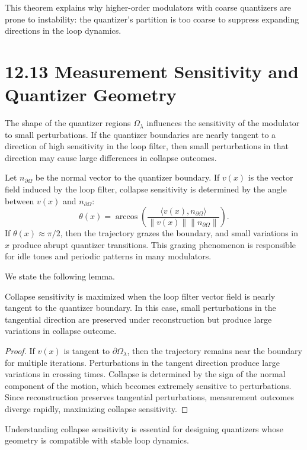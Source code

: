 This theorem explains why higher-order modulators with coarse quantizers are prone to instability: the quantizer’s partition is too coarse to suppress expanding directions in the loop dynamics.

\section*{12.13 Measurement Sensitivity and Quantizer Geometry}

The shape of the quantizer regions $\Omega_{\lambda}$ influences the sensitivity of the modulator to small perturbations. If the quantizer boundaries are nearly tangent to a direction of high sensitivity in the loop filter, then small perturbations in that direction may cause large differences in collapse outcomes.

Let $n_{\partial \Omega}$ be the normal vector to the quantizer boundary. If $v(x)$ is the vector field induced by the loop filter, collapse sensitivity is determined by the angle between $v(x)$ and $n_{\partial \Omega}$:
\[
\theta(x) = \arccos \left( \frac{\langle v(x), n_{\partial \Omega} \rangle}{\|v(x)\| \|n_{\partial \Omega}\|} \right).
\]
If $\theta(x) \approx \pi/2$, then the trajectory grazes the boundary, and small variations in $x$ produce abrupt quantizer transitions. This grazing phenomenon is responsible for idle tones and periodic patterns in many modulators.

We state the following lemma.

\begin{lemma}
Collapse sensitivity is maximized when the loop filter vector field is nearly tangent to the quantizer boundary. In this case, small perturbations in the tangential direction are preserved under reconstruction but produce large variations in collapse outcome.
\end{lemma}

\begin{proof}
If $v(x)$ is tangent to $\partial \Omega_{\lambda}$, then the trajectory remains near the boundary for multiple iterations. Perturbations in the tangent direction produce large variations in crossing times. Collapse is determined by the sign of the normal component of the motion, which becomes extremely sensitive to perturbations. Since reconstruction preserves tangential perturbations, measurement outcomes diverge rapidly, maximizing collapse sensitivity.
\end{proof}

Understanding collapse sensitivity is essential for designing quantizers whose geometry is compatible with stable loop dynamics.

